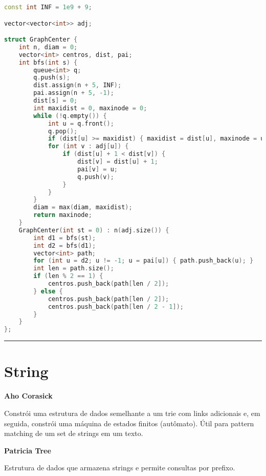\documentclass[11pt, a4paper, twoside]{book}
\begin{document}
\begin{lstlisting}[language=C++]
const int INF = 1e9 + 9;

vector<vector<int>> adj;

struct GraphCenter {
    int n, diam = 0;
    vector<int> centros, dist, pai;
    int bfs(int s) {
        queue<int> q;
        q.push(s);
        dist.assign(n + 5, INF);
        pai.assign(n + 5, -1);
        dist[s] = 0;
        int maxidist = 0, maxinode = 0;
        while (!q.empty()) {
            int u = q.front();
            q.pop();
            if (dist[u] >= maxidist) { maxidist = dist[u], maxinode = u; }
            for (int v : adj[u]) {
                if (dist[u] + 1 < dist[v]) {
                    dist[v] = dist[u] + 1;
                    pai[v] = u;
                    q.push(v);
                }
            }
        }
        diam = max(diam, maxidist);
        return maxinode;
    }
    GraphCenter(int st = 0) : n(adj.size()) {
        int d1 = bfs(st);
        int d2 = bfs(d1);
        vector<int> path;
        for (int u = d2; u != -1; u = pai[u]) { path.push_back(u); }
        int len = path.size();
        if (len % 2 == 1) {
            centros.push_back(path[len / 2]);
        } else {
            centros.push_back(path[len / 2]);
            centros.push_back(path[len / 2 - 1]);
        }
    }
};
\end{lstlisting}

\hfill

\rule{\textwidth}{0.4pt}

\newpage

%
%
%
%

\chapter{String}



\textbf{Aho Corasick} 



Constrói uma estrutura de dados semelhante a um trie com links adicionais e, em seguida, constrói uma máquina de estados finitos (autômato). Útil para pattern matching de um set de strings em um texto.





\textbf{Patricia Tree} 



Estrutura de dados que armazena strings e permite consultas por prefixo.
\end{document}

